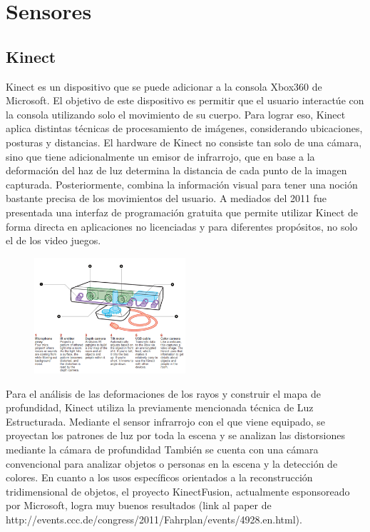 \section{Sensores}
\subsection{Kinect}

Kinect es un dispositivo que se puede adicionar a la consola  Xbox360 de Microsoft. El objetivo de este dispositivo es permitir que el usuario interactúe con la consola utilizando solo el movimiento de su cuerpo. Para lograr eso, Kinect aplica distintas técnicas de procesamiento de imágenes, considerando ubicaciones, posturas y distancias. El hardware de Kinect no consiste tan solo de una cámara, sino que tiene adicionalmente un emisor de infrarrojo, que en base a la deformación del haz de luz determina la distancia de cada punto de la imagen capturada. Posteriormente, combina la información visual para tener una noción bastante precisa de los movimientos del usuario. A mediados del 2011 fue presentada una interfaz de programación gratuita que permite utilizar Kinect de forma directa en aplicaciones no licenciadas y para diferentes propósitos, no solo el de los video juegos.

\begin{figure}[H]
  \centering
    \includegraphics[width=0.5\textwidth]{./Cap6_reconstruccion/kinect.PNG}
  \caption{}
  \label{fig:Kinect}
\end{figure}

Para el análisis de las deformaciones de los rayos y construir el mapa de profundidad, Kinect utiliza la previamente mencionada técnica de Luz Estructurada. Mediante el sensor infrarrojo con el que viene equipado, se proyectan los patrones de luz por toda la escena y se analizan las distorsiones mediante la cámara de profundidad
También se cuenta con una cámara convencional para analizar objetos o personas en la escena y la detección de colores.
En cuanto a los usos específicos orientados a la reconstrucción tridimensional de objetos, el proyecto KinectFusion, actualmente esponsoreado por Microsoft, logra muy buenos resultados (link al paper de http://events.ccc.de/congress/2011/Fahrplan/events/4928.en.html).

